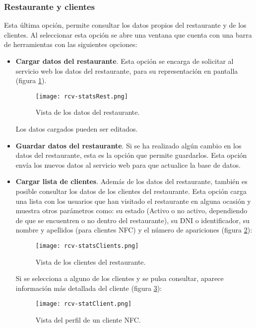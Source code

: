 \subsubsection{Restaurante y clientes}
Esta última opción, permite consultar los datos propios del restaurante y
de los clientes. Al seleccionar esta opción se abre una ventana que cuenta
con una barra de herramientas con las siguientes opciones:
\begin{itemize}
\item \textbf{Cargar datos del restaurante}. Esta opción se encarga de
solicitar al servicio web los datos del restaurante, para su representación
en pantalla (figura \ref{fig:rcv-statsRest}).

  \begin{figure}[ht]
    \begin{center}
      \texttt{[image: rcv-statsRest.png]}
      \caption{Vista de los datos del restaurante.}
      \label{fig:rcv-statsRest}
    \end{center}
  \end{figure}

Los datos cargados pueden ser editados.
\item \textbf{Guardar datos del restaurante}. Si se ha realizado algún cambio
en los datos del restaurante, esta es la opción que permite guardarlos. Esta
opción envía los nuevos datos al servicio web para que actualice la base de
datos.
\item \textbf{Cargar lista de clientes}. Además de los datos del restaurante,
también es posible consultar los datos de los clientes del restaurante. Esta
opción carga una lista con los usuarios que han visitado el restaurante en
alguna ocasión y muestra otros parámetros como: su estado (Activo o no activo,
dependiendo de que se encuentren o no dentro del restaurante), su DNI o
identificador, su nombre y apellidos (para clientes \acs{NFC}) y el número
de apariciones (figura \ref{fig:rcv-statsClients}):

  \begin{figure}[ht]
    \begin{center}
      \texttt{[image: rcv-statsClients.png]}
      \caption{Vista de los clientes del restaurante.}
      \label{fig:rcv-statsClients}
    \end{center}
  \end{figure}

Si se selecciona a alguno de los clientes y se pulsa consultar, aparece
información más detallada del cliente (figura \ref{fig:rcv-statClient}):

  \begin{figure}[H]
    \begin{center}
      \texttt{[image: rcv-statClient.png]}
      \caption{Vista del perfil de un cliente \acs{NFC}.}
      \label{fig:rcv-statClient}
    \end{center}
  \end{figure}
\end{itemize}


